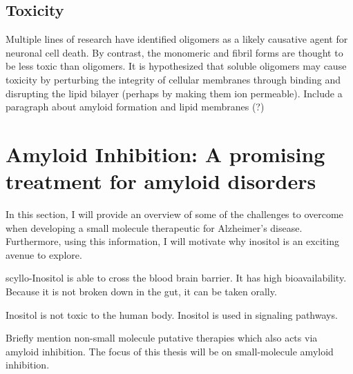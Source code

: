   \subsection{Toxicity}
  \begin{outline}
  	\1 Multiple lines of research have identified oligomers as a likely causative agent for neuronal cell death. By contrast, the monomeric and fibril forms are thought to be less toxic than oligomers. It is hypothesized that soluble oligomers may cause toxicity by perturbing the integrity of cellular membranes through binding and disrupting the lipid bilayer (perhaps by making them ion permeable). \cite{Walsh:2007fu}
  	\1 Include a paragraph about amyloid formation and lipid membranes (?)
  \end{outline}


\section{Amyloid Inhibition: A promising treatment for amyloid disorders}
\begin{outline}
	\1 In this section, I will provide an overview of some of the challenges to overcome when developing a small molecule therapeutic for Alzheimer's disease.  Furthermore, using this information, I will motivate why inositol is an exciting avenue to explore.
	
	  \2 scyllo-Inositol is able to cross the blood brain barrier. It has high bioavailability. Because it is not broken down in the gut, it can be taken orally.
	  
	  \2 Inositol is not toxic to the human body.  Inositol is used in signaling pathways.

	\1 Briefly mention non-small molecule putative therapies which also acts via amyloid inhibition. The focus of this thesis will be on small-molecule amyloid inhibition.
\end{outline}

